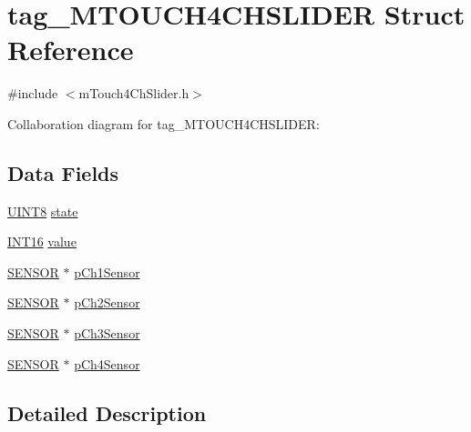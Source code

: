 \hypertarget{structtag___m_t_o_u_c_h4_c_h_s_l_i_d_e_r}{}\section{tag\+\_\+\+M\+T\+O\+U\+C\+H4\+C\+H\+S\+L\+I\+D\+E\+R Struct Reference}
\label{structtag___m_t_o_u_c_h4_c_h_s_l_i_d_e_r}


{\ttfamily \#include $<$m\+Touch4\+Ch\+Slider.\+h$>$}



Collaboration diagram for tag\+\_\+\+M\+T\+O\+U\+C\+H4\+C\+H\+S\+L\+I\+D\+E\+R\+:
\subsection*{Data Fields}
\begin{DoxyCompactItemize}
\item 
\hyperlink{_generic_type_defs_8h_ab27e9918b538ce9d8ca692479b375b6a}{U\+I\+N\+T8} \hyperlink{structtag___m_t_o_u_c_h4_c_h_s_l_i_d_e_r_a6e9c4cbd32a1178b12f3a61f6855c896}{state}
\item 
\hyperlink{_generic_type_defs_8h_ad87465075f24df28ef66f25e43f0bd5a}{I\+N\+T16} \hyperlink{structtag___m_t_o_u_c_h4_c_h_s_l_i_d_e_r_aedc7c0025d092e92a4cc5132a9a0634c}{value}
\item 
\hyperlink{m_touch_sensor_8h_a20ea6ae73be2b43f0c39bae385b66266}{S\+E\+N\+S\+O\+R} $\ast$ \hyperlink{structtag___m_t_o_u_c_h4_c_h_s_l_i_d_e_r_a41f98368630f8a733591c707f8dba5fb}{p\+Ch1\+Sensor}
\item 
\hyperlink{m_touch_sensor_8h_a20ea6ae73be2b43f0c39bae385b66266}{S\+E\+N\+S\+O\+R} $\ast$ \hyperlink{structtag___m_t_o_u_c_h4_c_h_s_l_i_d_e_r_a4d88a2538150ca92e2086160c812d5a4}{p\+Ch2\+Sensor}
\item 
\hyperlink{m_touch_sensor_8h_a20ea6ae73be2b43f0c39bae385b66266}{S\+E\+N\+S\+O\+R} $\ast$ \hyperlink{structtag___m_t_o_u_c_h4_c_h_s_l_i_d_e_r_a6a4b2cb8458f5776c0bbe64731e64792}{p\+Ch3\+Sensor}
\item 
\hyperlink{m_touch_sensor_8h_a20ea6ae73be2b43f0c39bae385b66266}{S\+E\+N\+S\+O\+R} $\ast$ \hyperlink{structtag___m_t_o_u_c_h4_c_h_s_l_i_d_e_r_ae56a74b10ecd9f4405f2e80247a3ee88}{p\+Ch4\+Sensor}
\end{DoxyCompactItemize}


\subsection{Detailed Description}


